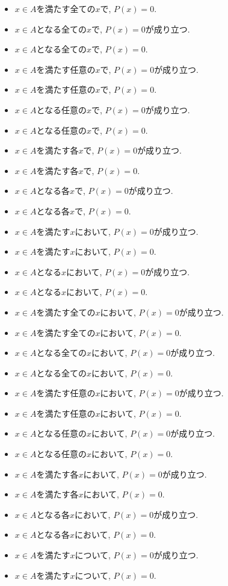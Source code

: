 \documentclass[a4paper,12pt,draft]{amsart}
\begin{document}
\begin{itemize}
\item $x\in A$を満たす全ての$x$で, $P(x)=0$.
\item $x\in A$となる全ての$x$で, $P(x)=0$が成り立つ.
\item $x\in A$となる全ての$x$で, $P(x)=0$.
\item $x\in A$を満たす任意の$x$で, $P(x)=0$が成り立つ.
\item $x\in A$を満たす任意の$x$で, $P(x)=0$.
\item $x\in A$となる任意の$x$で, $P(x)=0$が成り立つ.
\item $x\in A$となる任意の$x$で, $P(x)=0$.
\item $x\in A$を満たす各$x$で, $P(x)=0$が成り立つ.
\item $x\in A$を満たす各$x$で, $P(x)=0$.
\item $x\in A$となる各$x$で, $P(x)=0$が成り立つ.
\item $x\in A$となる各$x$で, $P(x)=0$.
\item $x\in A$を満たす$x$において, $P(x)=0$が成り立つ.
\item $x\in A$を満たす$x$において, $P(x)=0$.
\item $x\in A$となる$x$において, $P(x)=0$が成り立つ.
\item $x\in A$となる$x$において, $P(x)=0$.
\item $x\in A$を満たす全ての$x$において, $P(x)=0$が成り立つ.
\item $x\in A$を満たす全ての$x$において, $P(x)=0$.
\item $x\in A$となる全ての$x$において, $P(x)=0$が成り立つ.
\item $x\in A$となる全ての$x$において, $P(x)=0$.
\item $x\in A$を満たす任意の$x$において, $P(x)=0$が成り立つ.
\item $x\in A$を満たす任意の$x$において, $P(x)=0$.
\item $x\in A$となる任意の$x$において, $P(x)=0$が成り立つ.
\item $x\in A$となる任意の$x$において, $P(x)=0$.
\item $x\in A$を満たす各$x$において, $P(x)=0$が成り立つ.
\item $x\in A$を満たす各$x$において, $P(x)=0$.
\item $x\in A$となる各$x$において, $P(x)=0$が成り立つ.
\item $x\in A$となる各$x$において, $P(x)=0$.
\item $x\in A$を満たす$x$について, $P(x)=0$が成り立つ.
\item $x\in A$を満たす$x$について, $P(x)=0$.

\end{itemize}
\end{document}
